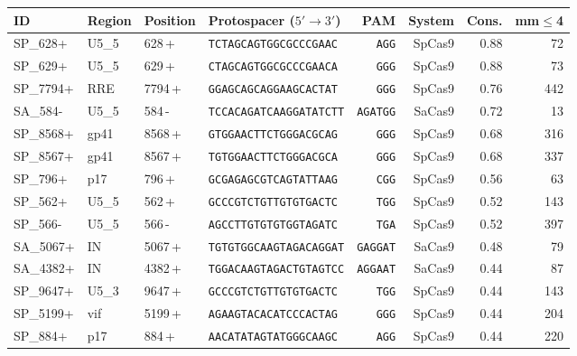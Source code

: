 \begin{tabular}{llllrrrr}
\toprule
ID & Region & Position & Protospacer ($5'\to3'$) & PAM & System & Cons. & mm$\le$4 \\
\midrule
SP\_628+ & U5\_5 & 628\,+ & \texttt{TCTAGCAGTGGCGCCCGAAC} & \texttt{AGG} & SpCas9 & 0.88 & 72 \\
SP\_629+ & U5\_5 & 629\,+ & \texttt{CTAGCAGTGGCGCCCGAACA} & \texttt{GGG} & SpCas9 & 0.88 & 73 \\
SP\_7794+ & RRE & 7794\,+ & \texttt{GGAGCAGCAGGAAGCACTAT} & \texttt{GGG} & SpCas9 & 0.76 & 442 \\
SA\_584- & U5\_5 & 584\,- & \texttt{TCCACAGATCAAGGATATCTT} & \texttt{AGATGG} & SaCas9 & 0.72 & 13 \\
SP\_8568+ & gp41 & 8568\,+ & \texttt{GTGGAACTTCTGGGACGCAG} & \texttt{GGG} & SpCas9 & 0.68 & 316 \\
SP\_8567+ & gp41 & 8567\,+ & \texttt{TGTGGAACTTCTGGGACGCA} & \texttt{GGG} & SpCas9 & 0.68 & 337 \\
SP\_796+ & p17 & 796\,+ & \texttt{GCGAGAGCGTCAGTATTAAG} & \texttt{CGG} & SpCas9 & 0.56 & 63 \\
SP\_562+ & U5\_5 & 562\,+ & \texttt{GCCCGTCTGTTGTGTGACTC} & \texttt{TGG} & SpCas9 & 0.52 & 143 \\
SP\_566- & U5\_5 & 566\,- & \texttt{AGCCTTGTGTGTGGTAGATC} & \texttt{TGA} & SpCas9 & 0.52 & 397 \\
SA\_5067+ & IN & 5067\,+ & \texttt{TGTGTGGCAAGTAGACAGGAT} & \texttt{GAGGAT} & SaCas9 & 0.48 & 79 \\
SA\_4382+ & IN & 4382\,+ & \texttt{TGGACAAGTAGACTGTAGTCC} & \texttt{AGGAAT} & SaCas9 & 0.44 & 87 \\
SP\_9647+ & U5\_3 & 9647\,+ & \texttt{GCCCGTCTGTTGTGTGACTC} & \texttt{TGG} & SpCas9 & 0.44 & 143 \\
SP\_5199+ & vif & 5199\,+ & \texttt{AGAAGTACACATCCCACTAG} & \texttt{GGG} & SpCas9 & 0.44 & 204 \\
SP\_884+ & p17 & 884\,+ & \texttt{AACATATAGTATGGGCAAGC} & \texttt{AGG} & SpCas9 & 0.44 & 220 \\
\bottomrule
\end{tabular}
